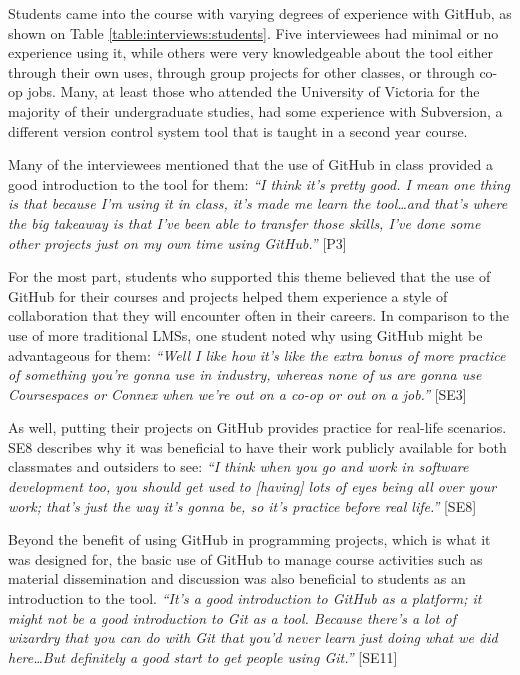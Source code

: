 Students came into the course with varying degrees of experience with GitHub, as shown on Table \ref{table:interviews:students}. Five interviewees had minimal or no experience using it, while others were very knowledgeable about the tool either through their own uses, through group projects for other classes, or through co-op jobs. Many, at least those who attended the University of Victoria for the majority of their undergraduate studies, had some experience with Subversion, a different version control system tool that is taught in a second year course.

Many of the interviewees mentioned that the use of GitHub in class provided a good introduction to the tool for them: \textit{``I think it's pretty good. I mean one thing is that because I'm using it in class, it's made me learn the tool\ldots and that's where the big takeaway is that I've been able to transfer those skills, I've done some other projects just on my own time using GitHub.''} [P3]


For the most part, students who supported this theme believed that the use of GitHub for their courses and projects helped them experience a style of collaboration that they will encounter often in their careers. In comparison to the use of more traditional LMSs, one student noted why using GitHub might be advantageous for them: \textit{``Well I like how it's like the extra bonus of more practice of something you're gonna use in industry, whereas none of us are gonna use Coursespaces or Connex when we're out on a co-op or out on a job.''} [SE3]

As well, putting their projects on GitHub provides practice for real-life scenarios. SE8 describes why it was beneficial to have their work publicly available for both classmates and outsiders to see: \textit{``I think when you go and work in software development too, you should get used to [having] lots of eyes being all over your work; that's just the way it's gonna be, so it's practice before real life.''} [SE8]

Beyond the benefit of using GitHub in programming projects, which is what it was designed for, the basic use of GitHub to manage course activities such as material dissemination and discussion was also beneficial to students as an introduction to the tool. \textit{``It's a good introduction to GitHub as a platform; it might not be a good introduction to Git as a tool. Because there's a lot of wizardry that you can do with Git that you'd never learn just doing what we did here\ldots But definitely a good start to get people using Git.''} [SE11]

